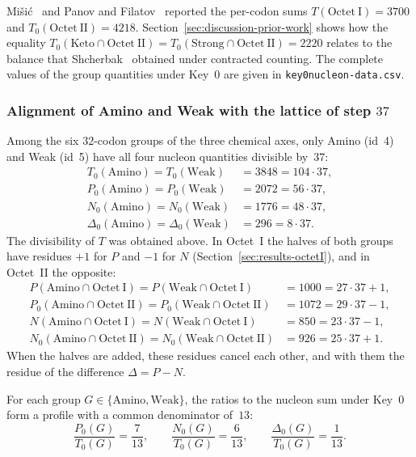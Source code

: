 \documentclass[11pt,a4paper]{article}
\renewcommand{\_}{\origunderscore\allowbreak}
\begin{document}
Mi\v{s}i\'c~\cite[Table~3]{misic2016} and Panov and Filatov~\cite{panov2024}
reported the per-codon sums $T(\mathrm{Octet~I})=3700$ and $T_{0}(\mathrm{Octet~II})=4218$.
Section~\ref{sec:discussion-prior-work} shows how the equality
$T_{0}(\mathrm{Keto}\cap\mathrm{Octet~II})=T_{0}(\mathrm{Strong}\cap\mathrm{Octet~II})=2220$
relates to the balance that Shcherbak~\cite{shcherbak1993,shcherbak2003}
obtained under contracted counting.
The complete values of the group quantities under Key~0 are given
in \texttt{key0\_nucleon-data.csv}.

\subsubsection{Alignment of Amino and Weak with the lattice of step
\texorpdfstring{$37$}{37}}
\label{sec:results-key0-aminoweak}

Among the six $32$-codon groups of the three chemical axes, only
Amino (id~4) and Weak (id~5) have all four nucleon quantities
divisible by~$37$:
\[
\begin{aligned}
T_{0}(\mathrm{Amino})=T_{0}(\mathrm{Weak})
  &=3848=104\cdot37, \\
P_{0}(\mathrm{Amino})=P_{0}(\mathrm{Weak})
  &=2072=56\cdot37, \\
N_{0}(\mathrm{Amino})=N_{0}(\mathrm{Weak})
  &=1776=48\cdot37, \\
\Delta_{0}(\mathrm{Amino})=\Delta_{0}(\mathrm{Weak})
  &=296=8\cdot37.
\end{aligned}
\]
The divisibility of $T$ was obtained above. In Octet~I the halves of
both groups have residues $+1$ for $P$ and $-1$ for $N$
(Section~\ref{sec:results-octetI}), and in Octet~II the opposite:
\[
\begin{aligned}
P(\mathrm{Amino}\cap\mathrm{Octet~I})
  =P(\mathrm{Weak}\cap\mathrm{Octet~I})
  &=1000=27\cdot37+1, \\
P_{0}(\mathrm{Amino}\cap\mathrm{Octet~II})
  =P_{0}(\mathrm{Weak}\cap\mathrm{Octet~II})
  &=1072=29\cdot37-1, \\
N(\mathrm{Amino}\cap\mathrm{Octet~I})
  =N(\mathrm{Weak}\cap\mathrm{Octet~I})
  &=850=23\cdot37-1, \\
N_{0}(\mathrm{Amino}\cap\mathrm{Octet~II})
  =N_{0}(\mathrm{Weak}\cap\mathrm{Octet~II})
  &=926=25\cdot37+1.
\end{aligned}
\]
When the halves are added, these residues cancel each other, and with
them the residue of the difference $\Delta=P-N$.

For each group $G\in\{\mathrm{Amino},\mathrm{Weak}\}$,
the ratios to the nucleon sum under Key~0 form a profile
with a common denominator of~$13$:
\[
\frac{P_0(G)}{T_0(G)}=\frac{7}{13},\qquad
\frac{N_0(G)}{T_0(G)}=\frac{6}{13},\qquad
\frac{\Delta_0(G)}{T_0(G)}=\frac{1}{13}.
\]
\end{document}
